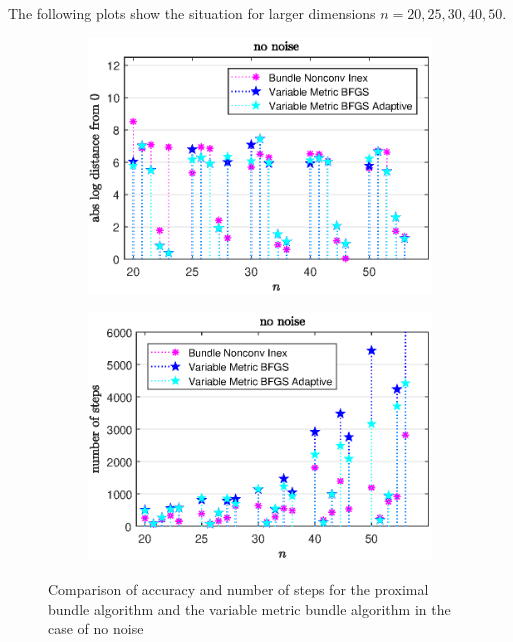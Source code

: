 The following plots show the situation for larger dimensions \(n = 20,25,30,40,50\).


\begin{figure}[H]%
	\begin{subfigure}{0.49\textwidth}
		\includegraphics[width=\textwidth]{Pictures/Plots/no_noise_b.eps}%
	\end{subfigure}
	\begin{subfigure}{0.49\textwidth}
		\includegraphics[width=\textwidth]{Pictures/Plots/steps_no_noise_b.eps}%
	\end{subfigure}
	\label{fig_no_noise_large}
	\caption{Comparison of accuracy and number of steps for the proximal bundle algorithm and the variable metric bundle algorithm in the case of no noise}
\end{figure}

